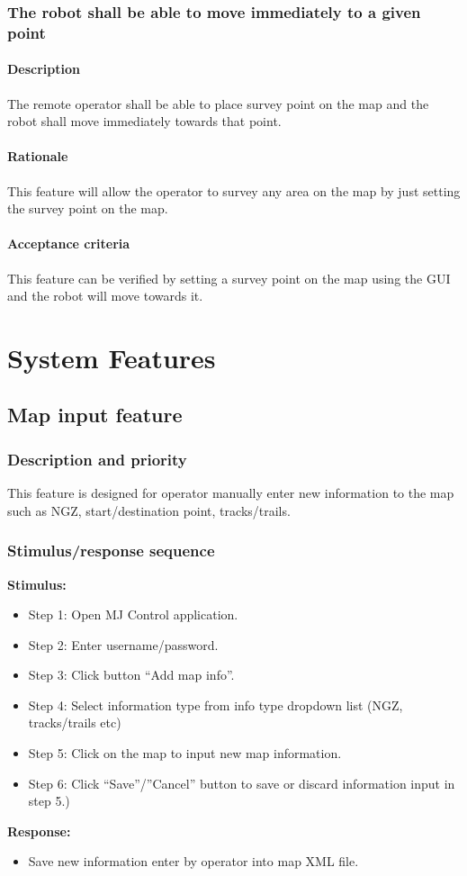 \documentclass[10pt,a4paper,titlepage]{article}
\begin{document}
    \subsubsection{The robot shall be able to move immediately to a given point}
     \paragraph{Description}   The remote operator shall be able to place survey point on the map and the robot shall move immediately towards that point.
    \paragraph{Rationale}   This feature will allow the operator to survey any area on the map by just setting the survey point on the map.
    \paragraph{Acceptance criteria}   This feature can be verified by setting a survey point on the map using the GUI and the robot will move towards it.

	\section{System Features}
	\subsection{Map input feature}
	\subsubsection{Description and priority}
	\text This feature is designed for operator manually enter new information to the map such as NGZ, start/destination point, tracks/trails.
	\subsubsection{Stimulus/response sequence}
	\textbf{Stimulus:}
	\begin{itemize}
		\item Step 1: Open MJ Control application.
		\item Step 2: Enter username/password.
		\item Step 3: Click button “Add map info”.
		\item Step 4: Select information type from info type dropdown list (NGZ, tracks/trails etc)
		\item Step 5: Click on the map to input new map information.
		\item Step 6: Click “Save”/”Cancel” button to save or discard information input in step 5.)
	\end{itemize}
	\textbf{Response:}
	\begin{itemize}
	\item	Save new information enter by operator into map XML file.
	\end{itemize}
\end{document}
